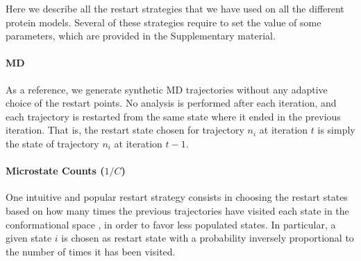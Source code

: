 
Here we describe all the restart strategies that we have used on all the
different protein models. Several of these strategies require to set the value
of some parameters, which are provided in the Supplementary material. 

\paragraph{MD} 
As a reference, we generate synthetic MD trajectories without any adaptive
choice of the restart points. No analysis is performed after each
iteration, and each trajectory is restarted from the same state where it
ended in the previous iteration. That is, the restart state chosen for
trajectory $n_i$ at iteration $t$ is simply the state of trajectory $n_i$ at
iteration $t-1$.


\paragraph{Microstate Counts ($1/C$)}
One intuitive and popular restart strategy consists in choosing the restart
states based on how many times the previous trajectories have visited each state
in the conformational space
\cite{weber2011characterization, Fabritiis-2014, AdaptivePELE-Lecina2017}, in
order to favor less populated states.  In particular, a
given state $i$ is chosen as restart state with a probability inversely
proportional to the number of times it has been visited.

